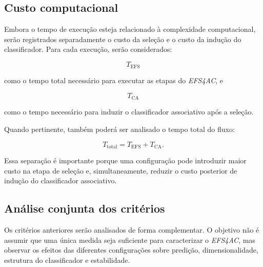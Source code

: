 \subsection{Custo computacional}
\label{subsec:ac-efs-avaliacao-tempo}

Embora o tempo de execução esteja relacionado à complexidade computacional,
serão registrados separadamente o custo da seleção e o custo da indução do
classificador. Para cada execução, serão considerados:

\begin{equation}
    T_{\mathrm{EFS}}
\end{equation}

como o tempo total necessário para executar as etapas do \textit{EFS4AC}, e

\begin{equation}
    T_{\mathrm{CA}}
\end{equation}

como o tempo necessário para induzir o classificador associativo após a
seleção.

Quando pertinente, também poderá ser analisado o tempo total do fluxo:

\begin{equation}
    T_{\mathrm{total}}
    =
    T_{\mathrm{EFS}}
    +
    T_{\mathrm{CA}}.
    \label{eq:tempo-total-ac-efs}
\end{equation}

Essa separação é importante porque uma configuração pode introduzir maior custo
na etapa de seleção e, simultaneamente, reduzir o custo posterior de indução do
classificador associativo.


\subsection{Análise conjunta dos critérios}
\label{subsec:ac-efs-avaliacao-conjunta}

Os critérios anteriores serão analisados de forma complementar. O objetivo não
é assumir que uma única medida seja suficiente para caracterizar o
\textit{EFS4AC}, mas observar os efeitos das diferentes configurações sobre
predição, dimensionalidade, estrutura do classificador e estabilidade.

